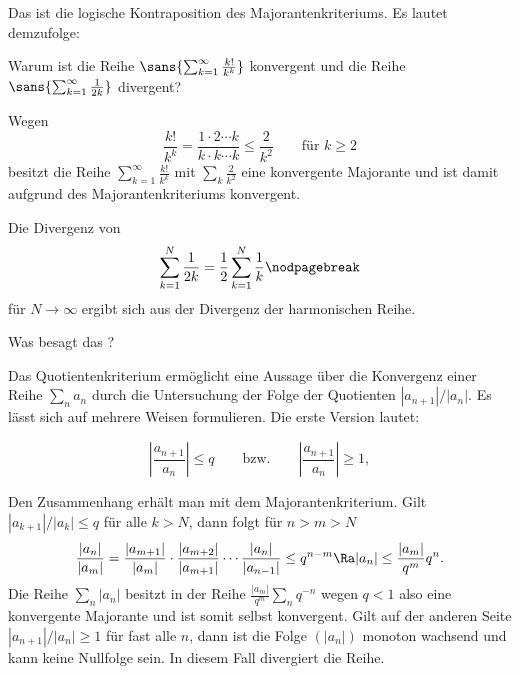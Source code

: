 \begin{antwort}
  Das  
  ist die logische Kontraposition des Majorantenkriteriums. 
  Es lautet demzufolge:  

  \medskip\noindent
  \AntEnd  
\end{antwort} 

\begin{frage}\label{02_bsp1}
  Warum ist die Reihe 
  $\sans{\sum_{k=1}^\infty \frac{k!}{k^k}}$ konvergent und die 
  Reihe $\sans{\sum_{k=1}^\infty \frac{1}{2k}}$ divergent?
\end{frage}

\begin{antwort}
  Wegen 
  \[
  \frac{k!}{k^k} = \frac{1\cdot 2 \cdots k }{k\cdot k\cdots k} \le 
  \frac{2}{k^2}\qquad\text{für $k\ge 2$}
  \]
  besitzt die Reihe $\sum_{k=1}^\infty \frac{k!}{k^k}$ mit 
  $\sum_k \frac{2}{k^2}$ eine konvergente Majorante und ist damit aufgrund 
  des Majorantenkriteriums konvergent.

  Die Divergenz von 
  \[
  \sum_{k=1}^N \frac{1}{2k} 
  = \frac{1}{2} \sum_{k=1}^N \frac{1}{k} \nodpagebreak
  \]
  für $N\to\infty$ ergibt sich aus der Divergenz 
  der harmonischen Reihe. 
  \AntEnd
\end{antwort}

\begin{frage}\label{02_quot}
  Was besagt das ? 
\end{frage}

\begin{antwort}
  Das Quotientenkriterium ermöglicht eine Aussage über die 
  Konvergenz einer Reihe $\sum_n a_n$ durch die Untersuchung der 
  Folge der Quotienten $|a_{n+1}|/|a_n|$. Es lässt sich auf mehrere Weisen 
  formulieren. Die erste Version lautet:

  \medskip
  \noindent
  \[
  \left| \frac{a_{n+1}}{a_n} \right|\le q \qquad\text{bzw.}\qquad
  \left| \frac{a_{n+1}}{a_n}\right| \ge 1,
  \]

  \medskip\noindent 
  Den Zusammenhang erhält man mit dem Majorantenkriterium. 
  Gilt $|a_{k+1}|/|a_k| \le q$ für alle $k>N$, dann folgt für $n>m>N$
  \[
  \frac{ |a_n| }{ |a_m| } = 
  \frac{ |a_{m+1}| }{ |a_m| } \cdot \frac{ |a_{m+2}| }{ |a_{m+1}| }
  \cdots \frac{ |a_{n}| }{ |a_{n-1}| } \le q^{n-m} \Ra 
  |a_n| \le \frac{|a_m|}{q^m} q^n.
  \]
  Die Reihe $\sum_n |a_n|$ besitzt in der Reihe 
  $\frac{|a_m|}{ q^m} \sum _n q^{-n}$ wegen $q<1$ 
  also eine konvergente Majorante und ist somit selbst konvergent. 
  Gilt auf der anderen Seite $|a_{n+1}|/|a_n| \ge 1$ für fast alle $n$, 
  dann ist die Folge $(|a_n|)$ monoton wachsend und kann keine Nullfolge 
  sein. In diesem Fall divergiert die Reihe.
\end{antwort}


